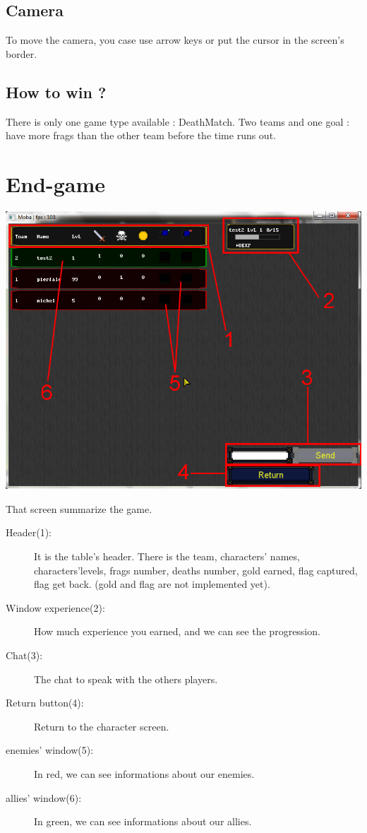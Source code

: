 \documentclass{scrreprt}
\begin{document}
			  \section{Camera}
			  To move the camera, you case use arrow keys or put the cursor in the screen's border.
			  \section{How to win ?}
			  There is only one game type available : DeathMatch. Two teams and one goal : have more frags than the other team before the time runs out.
			  \chapter{End-game}
			  \begin{center}
			  \includegraphics[scale=0.4]{end_screen.png}
			  \end{center}
			  That screen summarize the game.
			  \begin{description}
			  \item[Header(1):]{It is the table's header. There is the team,  characters' names, characters'levels, frags number, deaths number, gold earned, flag captured, flag get back. (gold and flag are not implemented yet).}
			  \item[Window experience(2):]{How much experience you earned, and we can see the progression.}
			  \item[Chat(3):]{The chat to speak with the others players.}
			  \item[Return button(4):]{Return to the character screen.}
			  \item[enemies' window(5):]{In red, we can see informations about our enemies.}
			  \item[allies' window(6):]{In green, we can see informations about our allies.}
			  \end{description}
\end{document}
